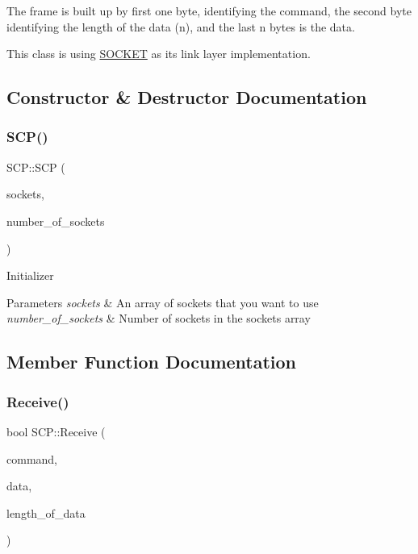 The frame is built up by first one byte, identifying the command, the second byte identifying the length of the data (n), and the last n bytes is the data.

This class is using \hyperlink{class_s_o_c_k_e_t}{S\+O\+C\+K\+ET} as its link layer implementation. 

\subsection{Constructor \& Destructor Documentation}
\hypertarget{class_s_c_p_a9ab03c4d3f03f25c1953b13120ec7b71}{}\label{class_s_c_p_a9ab03c4d3f03f25c1953b13120ec7b71} 
\subsubsection{\texorpdfstring{S\+C\+P()}{SCP()}}
{\footnotesize\ttfamily S\+C\+P\+::\+S\+CP (\begin{DoxyParamCaption}\item[{\hyperlink{class_s_o_c_k_e_t}{S\+O\+C\+K\+ET} $\ast$$\ast$}]{sockets,  }\item[{uint8\+\_\+t}]{number\+\_\+of\+\_\+sockets }\end{DoxyParamCaption})}

Initializer 
\begin{DoxyParams}{Parameters}
{\em sockets} & An array of sockets that you want to use \\
\hline
{\em number\+\_\+of\+\_\+sockets} & Number of sockets in the sockets array \\
\hline
\end{DoxyParams}


\subsection{Member Function Documentation}
\hypertarget{class_s_c_p_ab01a551b8edf803faaea5b0310345498}{}\label{class_s_c_p_ab01a551b8edf803faaea5b0310345498} 
\subsubsection{\texorpdfstring{Receive()}{Receive()}}
{\footnotesize\ttfamily bool S\+C\+P\+::\+Receive (\begin{DoxyParamCaption}\item[{uint8\+\_\+t \&}]{command,  }\item[{uint8\+\_\+t $\ast$}]{data,  }\item[{uint8\+\_\+t \&}]{length\+\_\+of\+\_\+data }\end{DoxyParamCaption})}

